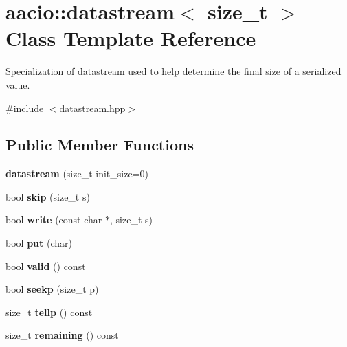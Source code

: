 \hypertarget{classaacio_1_1datastream_3_01size__t_01_4}{}\section{aacio\+:\+:datastream$<$ size\+\_\+t $>$ Class Template Reference}
\label{classaacio_1_1datastream_3_01size__t_01_4}


Specialization of datastream used to help determine the final size of a serialized value.  




{\ttfamily \#include $<$datastream.\+hpp$>$}

\subsection*{Public Member Functions}
\begin{DoxyCompactItemize}
\item 
\mbox{\label{classaacio_1_1datastream_3_01size__t_01_4_a36615631e7f2bd6849224d3e5ba6a60a}} 
{\bfseries datastream} (size\+\_\+t init\+\_\+size=0)
\item 
\mbox{\label{classaacio_1_1datastream_3_01size__t_01_4_ab742a817c3aa35067c829a0a0a029934}} 
bool {\bfseries skip} (size\+\_\+t s)
\item 
\mbox{\label{classaacio_1_1datastream_3_01size__t_01_4_a91b662290cfd0c0a5cfe942a9e5070e3}} 
bool {\bfseries write} (const char $\ast$, size\+\_\+t s)
\item 
\mbox{\label{classaacio_1_1datastream_3_01size__t_01_4_aa773b63125af2b01af71ac8b66336842}} 
bool {\bfseries put} (char)
\item 
\mbox{\label{classaacio_1_1datastream_3_01size__t_01_4_afc63cc463193c09a214182d50ab1a321}} 
bool {\bfseries valid} () const
\item 
\mbox{\label{classaacio_1_1datastream_3_01size__t_01_4_ad624bc3dbf59c26ac61f3c3dcd8b7906}} 
bool {\bfseries seekp} (size\+\_\+t p)
\item 
\mbox{\label{classaacio_1_1datastream_3_01size__t_01_4_ac2efde59235e86584c7b994ee200bb25}} 
size\+\_\+t {\bfseries tellp} () const
\item 
\mbox{\label{classaacio_1_1datastream_3_01size__t_01_4_ab51a3f7083a505338568fd6c26ae3278}} 
size\+\_\+t {\bfseries remaining} () const
\end{DoxyCompactItemize}


